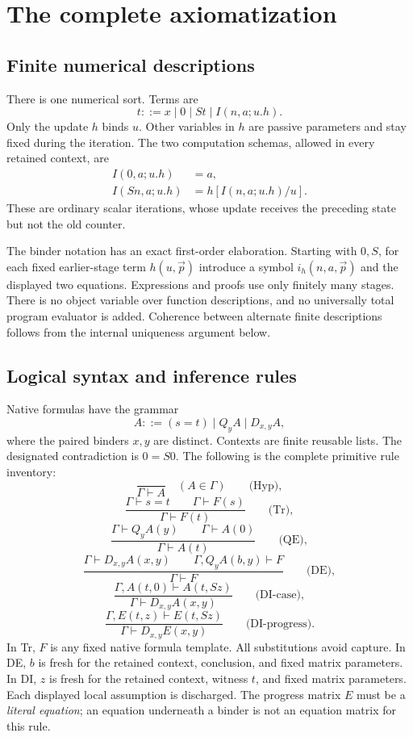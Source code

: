 \section{The complete axiomatization}
\label{sec:complete-theory}

\subsection{Finite numerical descriptions}

There is one numerical sort. Terms are
\[
                 t::=x\mid 0\mid St\mid I(n,a;u.h).
\]
Only the update $h$ binds $u$. Other variables in $h$ are passive
parameters and stay fixed during the iteration. The two computation
schemas, allowed in every retained context, are
\begin{align}
 I(0,a;u.h)&=a,\tag{I0}\label{up:i0}\\
 I(Sn,a;u.h)&=h[I(n,a;u.h)/u].\tag{IS}\label{up:is}
\end{align}
These are ordinary scalar iterations, whose update receives the preceding
state but not the old counter.

The binder notation has an exact first-order elaboration. Starting with
$0,S$, for each fixed earlier-stage term $h(u,\vec p)$ introduce a symbol
$i_h(n,a,\vec p)$ and the displayed two equations. Expressions and proofs
use only finitely many stages. There is no object variable over function
descriptions, and no universally total program evaluator is added.
Coherence between alternate finite descriptions follows from the internal
uniqueness argument below.

\subsection{Logical syntax and inference rules}

Native formulas have the grammar
\[
            A::=(s=t)\mid Q_yA\mid D_{x,y}A,
\]
where the paired binders $x,y$ are distinct. Contexts are finite reusable
lists. The designated contradiction is $0=S0$.
The following is the complete primitive rule inventory:
\[
 \frac{}{\Gamma\vdash A}\quad(A\in\Gamma)\qquad\text{(Hyp)},
\]
\[
 \frac{\Gamma\vdash s=t\qquad\Gamma\vdash F(s)}
      {\Gamma\vdash F(t)}\qquad\text{(Tr)},
\]
\[
 \frac{\Gamma\vdash Q_yA(y)\qquad\Gamma\vdash A(0)}
      {\Gamma\vdash A(t)}\qquad\text{(QE)},
\]
\[
 \frac{\Gamma\vdash D_{x,y}A(x,y)\qquad
       \Gamma,Q_yA(b,y)\vdash F}
      {\Gamma\vdash F}\qquad\text{(DE)},
\]
\[
 \frac{\Gamma,A(t,0)\vdash A(t,Sz)}
      {\Gamma\vdash D_{x,y}A(x,y)}\qquad\text{(DI-case)},
\]
\[
 \frac{\Gamma,E(t,z)\vdash E(t,Sz)}
      {\Gamma\vdash D_{x,y}E(x,y)}\qquad\text{(DI-progress)}.
\]
In Tr, $F$ is any fixed native formula template. All substitutions avoid
capture. In DE, $b$ is fresh for the retained context, conclusion, and
fixed matrix parameters. In DI, $z$ is fresh for the retained context,
witness $t$, and fixed matrix parameters. Each displayed local assumption
is discharged. The progress matrix $E$ must be a \emph{literal equation};
an equation underneath a binder is not an equation matrix for this rule.

